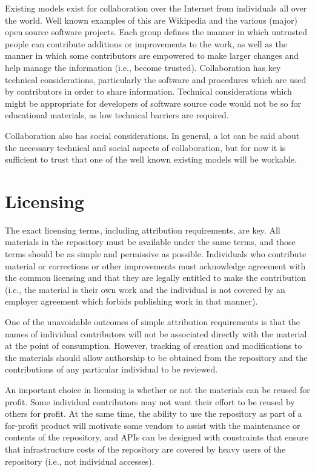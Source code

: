 Existing models exist for collaboration over the Internet from individuals
all over the world.  Well known examples of this are Wikipedia and the
various (major) open source software projects.  Each group defines the 
manner in which untrusted people can contribute additions or improvements to
the work, as well as the manner in which some contributors are empowered to
make larger changes and help manage the information (i.e., become trusted).
Collaboration has
key technical considerations, particularly the software and procedures which
are used by contributors in order to share information.  Technical considerations
which might be appropriate for developers of software source code would not
be so for educational materials, as low technical barriers are required.

Collaboration also has social considerations.  In general, a lot can be said
about the necessary technical and social aspects of collaboration, but for
now it is sufficient to trust that one of the well known existing models will
be workable.

\section*{Licensing}

The exact licensing terms, including attribution requirements, are key.  All materials in the
repository must be available under the same terms, and those terms should be as simple
and permissive as possible.  Individuals who contribute material or corrections or other 
improvements must acknowledge agreement with the common licensing and that
they are legally entitled to make the contribution (i.e., the material is
their own work and the individual is not covered by an employer agreement
which forbids publishing work in that manner).

One of the unavoidable outcomes of simple attribution requirements is that
the names of individual contributors
will not be associated directly with the material at the point of consumption.
However, tracking of creation and modifications to the materials should allow 
authorship to be obtained from the repository and the contributions of any
particular individual to be reviewed.

An important choice in licensing is whether or not the materials can be reused
for profit.  Some individual contributors may not want their effort to be 
reused by others for profit.  At the same time, the ability to use the 
repository as part of a for-profit product will motivate some vendors to assist with
the maintenance or contents of the repository, and APIs can be designed with
constraints that ensure that infrastructure costs of the repository are covered by heavy
users of the repository (i.e., not individual accesses).

